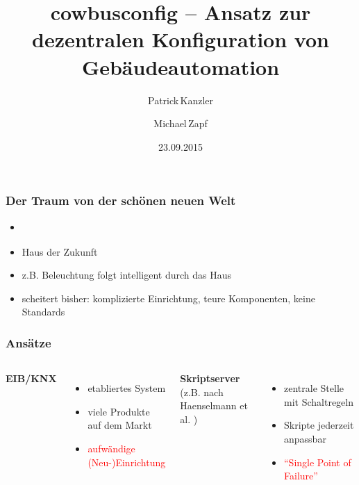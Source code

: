 \documentclass{beamer}
\title{cowbusconfig – Ansatz zur dezentralen Konfiguration von Gebäudeautomation}
\author[P. Kanzler, M. Zapf]{Patrick\,Kanzler \and Michael\,Zapf}
\date{23.09.2015}
\newcommand{\todo}[1]{\textbf{\color{red}{TODO: #1}}}
\newcommand{\customitemsep}{7pt}
\begin{document}
\frame{\titlepage}

\begin{frame}
	\frametitle{Der Traum von der schönen neuen Welt}

	\begin{itemize} \setlength{\itemsep}{\customitemsep}
		\item \todo{schön darstellen, vielleicht mit Bildern, momentan nur Stichpunkte}
		\item Haus der Zukunft
		\item z.B. Beleuchtung folgt intelligent durch das Haus
        \item scheitert bisher: komplizierte Einrichtung, teure Komponenten, keine Standards
	\end{itemize}
\end{frame}

\begin{frame}
	\frametitle{Ansätze}
    \begin{columns}[c]
        \column[c]{10cm}
            \textbf{EIB/KNX} \cite{knx-prod}
            \begin{itemize} \setlength{\itemsep}{\customitemsep}
                \item etabliertes System
                \item viele Produkte auf dem Markt
                    \vspace*{0.5cm}
                \item \textcolor{red}{aufwändige (Neu-)Einrichtung}
            \end{itemize}
        \column{10cm}
            \textbf{Skriptserver} \\
            {\fontsize{15pt}{18pt} \selectfont (z.B. nach Haenselmann et al. \cite{haenselmann2007skriptbasierte})}
            \begin{itemize} \setlength{\itemsep}{\customitemsep}
                \item zentrale Stelle mit Schaltregeln
                \item Skripte jederzeit anpassbar
                    \vspace*{0.5cm}
                \item \textcolor{red}{\enquote{Single Point of Failure}}
            \end{itemize}
    \end{columns}
\end{frame}
\end{document}
